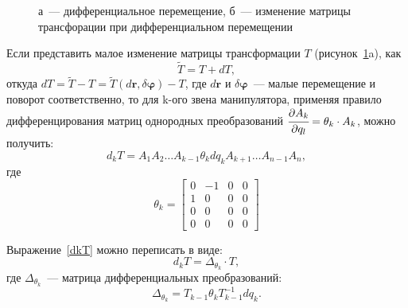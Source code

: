 \begin{figure}[h!]
	\begin{minipage}[h]{0.5\linewidth}
	\end{minipage}
	\hfill
	\begin{minipage}[h]{0.5\linewidth}
	\end{minipage}
	\caption{а~--- дифференциальное перемещение, б~--- изменение матрицы трансфорации при дифференциальном перемещении}
	\label{img:diff_transformations}
\end{figure}

Если представить малое изменение матрицы трансформации $ T $ (рисунок~\ref{img:diff_transformations}a), как
\begin{equation}
	\tilde{T} = T + dT,
\end{equation}
откуда $ dT = \tilde{T} - T = \tilde{T}(d\bm{r}, \delta\bm{\varphi}) - T$, где $ d\bm{r} $ и $ \delta\bm{\varphi} $~--- малые перемещение и поворот соответственно, то для k-ого звена манипулятора,  применяя правило дифференцирования матриц однородных преобразований $ \cfrac{\partial A_k}{\partial q_l} = \theta_k \cdot A_k $, можно получить:
\begin{equation}\label{dkT}
	d_k T = A_1 A_2 \dots A_{k-1} \theta_k dq_k A_{k+1} \dots A_{n-1} A_n,
\end{equation}
где 
\begin{equation}
	\theta_k = 
	\begin{bmatrix}
	0 & -1 & 0 & 0 \\
	1 & 0 & 0 & 0 \\
	0 & 0 & 0 & 0 \\
	0 & 0 & 0 & 0
	\end{bmatrix}
\end{equation}

Выражение~\eqref{dkT} можно переписать в виде:
\begin{equation}
	d_k T = \Delta_{\theta_k} \cdot T,
\end{equation}
где $ \Delta_{\theta_k} $~--- матрица дифференциальных преобразований:
\begin{equation}\label{Delta_matrix}
	\Delta_{\theta_k} = T_{k-1} \theta_k T_{k-1}^{-1} dq_k.
\end{equation}

